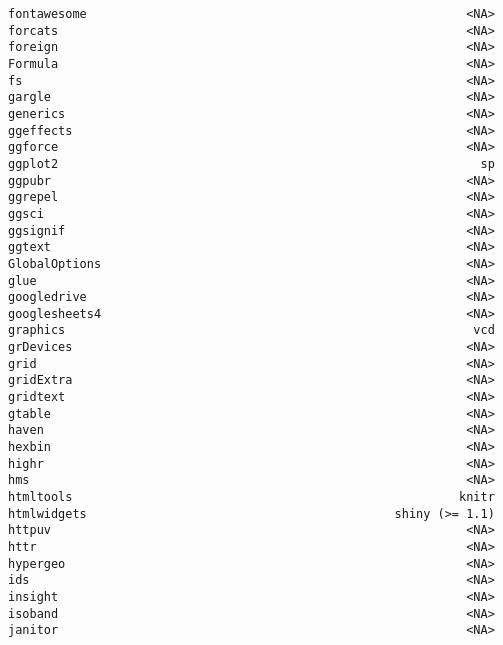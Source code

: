 \documentclass[
  letterpaper,
  DIV=11,
  numbers=noendperiod]{scrreprt}
\begin{document}
\begin{verbatim}
fontawesome                                                     <NA>
forcats                                                         <NA>
foreign                                                         <NA>
Formula                                                         <NA>
fs                                                              <NA>
gargle                                                          <NA>
generics                                                        <NA>
ggeffects                                                       <NA>
ggforce                                                         <NA>
ggplot2                                                           sp
ggpubr                                                          <NA>
ggrepel                                                         <NA>
ggsci                                                           <NA>
ggsignif                                                        <NA>
ggtext                                                          <NA>
GlobalOptions                                                   <NA>
glue                                                            <NA>
googledrive                                                     <NA>
googlesheets4                                                   <NA>
graphics                                                         vcd
grDevices                                                       <NA>
grid                                                            <NA>
gridExtra                                                       <NA>
gridtext                                                        <NA>
gtable                                                          <NA>
haven                                                           <NA>
hexbin                                                          <NA>
highr                                                           <NA>
hms                                                             <NA>
htmltools                                                      knitr
htmlwidgets                                           shiny (>= 1.1)
httpuv                                                          <NA>
httr                                                            <NA>
hypergeo                                                        <NA>
ids                                                             <NA>
insight                                                         <NA>
isoband                                                         <NA>
janitor                                                         <NA>

\end{verbatim}
\end{document}
